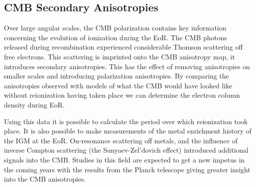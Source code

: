 
\subsection{CMB Secondary Anisotropies} %
\label{sub:cmb_secondary_anisotropies}
	Over large angular scales, the CMB polarization contains key information concerning the evolution of ionization during the EoR. The CMB photons released during recombination experienced considerable Thomson scattering off free electrons. This scattering is imprinted onto the CMB anisotropy map, it introduces secondary anisotropies. This has the effect of removing anisotropies on smaller scales and introducing polarization anisotropies. By comparing the anisotropies observed with models of what the CMB would have looked like without reionization having taken place we can determine the electron column density during EoR.

	Using this data it is possible to calculate the period over which reionization took place. It is also possible to make measurements of the metal enrichment history of the IGM at the EoR. On-resonance scattering off metals, and the influence of inverse Compton scattering (the Sunyaev-Zel’dovich effect) introduced additional signals into the CMB\cite{Monteagudo2006}. Studies in this field are expected to get a new impetus in the coming years with the results from the Planck telescope giving greater insight into the CMB anisotropies.
